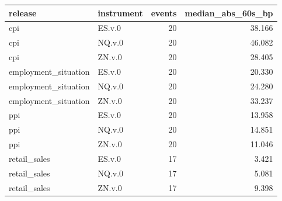 \begin{tabular}{llrr}
\toprule
release & instrument & events & median_abs_60s_bp \\
\midrule
cpi & ES.v.0 & 20 & 38.166 \\
cpi & NQ.v.0 & 20 & 46.082 \\
cpi & ZN.v.0 & 20 & 28.405 \\
employment_situation & ES.v.0 & 20 & 20.330 \\
employment_situation & NQ.v.0 & 20 & 24.280 \\
employment_situation & ZN.v.0 & 20 & 33.237 \\
ppi & ES.v.0 & 20 & 13.958 \\
ppi & NQ.v.0 & 20 & 14.851 \\
ppi & ZN.v.0 & 20 & 11.046 \\
retail_sales & ES.v.0 & 17 & 3.421 \\
retail_sales & NQ.v.0 & 17 & 5.081 \\
retail_sales & ZN.v.0 & 17 & 9.398 \\
\bottomrule
\end{tabular}
